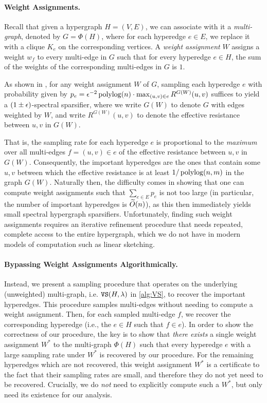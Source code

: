 \documentclass{article}
\begin{document}
\paragraph{Weight Assignments.}
Recall that given a hypergraph $H = (V, E)$, we can associate with it a \emph{multi-graph}, denoted by $G = \Phi(H)$, where for each hyperedge $e \in E$, we replace it with a clique $K_e$ on the corresponding vertices. A \textit{weight assignment} $W$ assigns a weight $w_f$ to every multi-edge in $G$ such that for every hyperedge $e \in H$, the sum of the weights of the corresponding multi-edges in $G$ is $1$.

As shown in \cite{KKTY21b,JambulapatiLS23,Lee23}, for any weight assignment $W$ of $G$, sampling each hyperedge $e$
with probability given by $p_e = \epsilon^{-2} \operatorname{polylog}(n)\cdot \max_{(u,v) \in e} R^{G(W)}(u,v)$ suffices to yield a $(1\pm\epsilon)$-spectral sparsifier,
where we write $G(W)$ to denote $G$ with edges weighted by $W$,
and write $R^{G(W)}(u,v)$ to denote the effective resistance between $u,v$
in $G(W)$.

That is,
the sampling rate for each hyperedge $e$ is proportional to the \emph{maximum} over all multi-edges $f = (u,v) \in e$ of the effective resistance between $u,v$ in $G(W)$.
Consequently, the important hyperedges are the ones that contain some $u,v$ between which
the effective resistance is at least $1/\operatorname{polylog}(n,m)$ in the graph $G(W)$. Naturally then, the difficulty comes in showing that one can compute weight assignments such that $\sum_{e \in E} p_e$ is not too large (in particular, the number of important hyperedges is $\widetilde{O}(n)$), as this then immediately yields small spectral hypergraph sparsifiers. Unfortunately, finding such weight assignments requires an iterative refinement procedure that needs
repeated, complete access to the entire hypergraph,
which we do not have in modern models of computation such as linear sketching.

\paragraph{Bypassing Weight Assignments Algorithmically.}
Instead, we present a sampling procedure that operates on the underlying (unweighted) multi-graph, i.e. $\mathtt{VS}(H,\lambda)$ in \cref{alg:VS},
to recover the important hyperedges.
This procedure samples multi-edges without needing to compute a weight assignment. Then, for each sampled multi-edge $f$, we recover the corresponding hyperedge (i.e., the $e \in H$ such that $f \in e$). In order to show the correctness of our procedure, the key is to show that \emph{there exists} a single weight assignment $W^*$ to the multi-graph $\Phi(H)$ such that every hyperedge $e$ with a large sampling rate under $W^*$ is recovered by our procedure. For the remaining hyperedges which are not recovered, this weight assignment $W^*$ is a certificate to the fact that their sampling rates are small, and therefore they do not yet need to be recovered. Crucially, we do \textit{not} need to explicitly
compute such a $W^*$, but only need its existence for our analysis.
\end{document}
